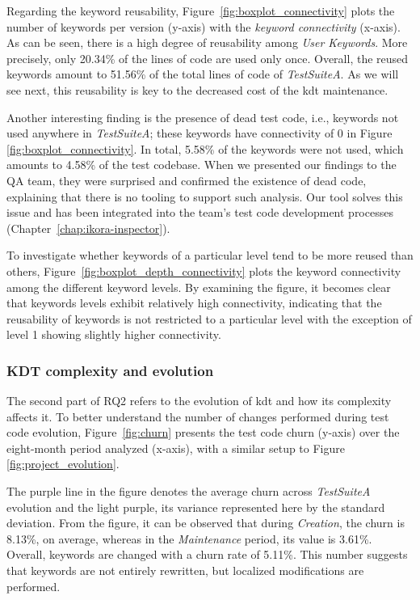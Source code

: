 Regarding the keyword reusability, Figure~\ref{fig:boxplot_connectivity} plots the number of keywords per version (y-axis) with the \emph{keyword connectivity} (x-axis). As can be seen, there is a high degree of reusability among \emph{User Keywords}. More precisely, only 20.34\% of the lines of code are used only once. Overall, the reused keywords amount to 51.56\% of the total lines of code of \emph{TestSuiteA}. As we will see next, this reusability is key to the decreased cost of the \gls{kdt} maintenance.

Another interesting finding is the presence of dead test code, i.e., keywords not used anywhere in \emph{TestSuiteA}; these keywords have connectivity of 0 in Figure \ref{fig:boxplot_connectivity}. In total, 5.58\% of the keywords were not used, which amounts to 4.58\% of the test codebase. When we presented our findings to the QA team, they were surprised and confirmed the existence of dead code, explaining that there is no tooling to support such analysis. Our tool solves this issue and has been integrated into the team's test code development processes (Chapter~\ref{chap:ikora-inspector}).

To investigate whether keywords of a particular level tend to be more reused than others, Figure~\ref{fig:boxplot_depth_connectivity} plots the keyword connectivity among the different keyword levels. By examining the figure, it becomes clear that keywords levels exhibit relatively high connectivity, indicating that the reusability of keywords is not restricted to a particular level with the exception of level 1 showing slightly higher connectivity.



\subsubsection{KDT complexity and evolution}
\label{sec:kdt-complexity-evolution}

The second part of RQ2 refers to the evolution of \gls{kdt} and how its complexity affects it. To better understand the number of changes performed during test code evolution, Figure~\ref{fig:churn} presents the test code churn (y-axis) over the eight-month period analyzed (x-axis), with a similar setup to Figure \ref{fig:project_evolution}.

The purple line in the figure denotes the average churn across \emph{TestSuiteA} evolution and the light purple, its variance represented here by the standard deviation. From the figure, it can be observed that during \emph{Creation}, the churn is 8.13\%, on average, whereas in the \emph{Maintenance} period, its value is 3.61\%. Overall, keywords are changed with a churn rate of 5.11\%. This number suggests that keywords are not entirely rewritten, but localized modifications are performed.

